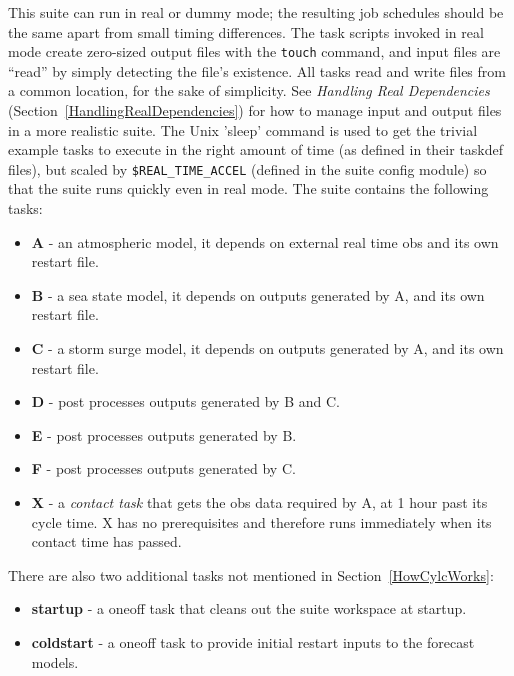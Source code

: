 

This suite can run in real or dummy mode; the resulting job 
schedules should be the same apart from small timing differences.
The task scripts invoked in real mode create zero-sized output files
with the \lstinline=touch= command, and input files are ``read'' by
simply detecting the file's existence.  All tasks read and write files
from a common location, for the sake of simplicity. 
See {\em Handling Real Dependencies}
(Section~\ref{HandlingRealDependencies}) for how to manage input and
output files in a more realistic suite. 
The Unix 'sleep' command is used to get the trivial example tasks to
execute in the right amount of time (as defined in their taskdef files),
but scaled by \lstinline=$REAL_TIME_ACCEL= 
(defined in the suite config module)
so that the suite runs quickly even in real mode.
The suite contains the following tasks:

\begin{itemize}
    \item {\bf A} - an atmospheric model, it depends on external real
        time obs and its own restart file.
    \item {\bf B} - a sea state model, it depends on outputs generated
        by A, and its own restart file.
    \item {\bf C} - a storm surge model, it depends on outputs generated
        by A, and its own restart file.
    \item {\bf D} - post processes outputs generated by B and C.
    \item {\bf E} - post processes outputs generated by B.
    \item {\bf F} - post processes outputs generated by C.
    \item {\bf X} - a {\em contact task} that gets the obs data required
    by A, at 1 hour past its cycle time. X has no prerequisites and
    therefore runs immediately when its contact time has passed.
\end{itemize}

There are also two additional tasks not mentioned in Section~\ref{HowCylcWorks}:

\begin{itemize}
    \item {\bf startup} - a oneoff task that cleans out the suite
    workspace at startup.
    \item {\bf coldstart} - a oneoff task to provide initial restart
        inputs to the forecast models. 
\end{itemize}

